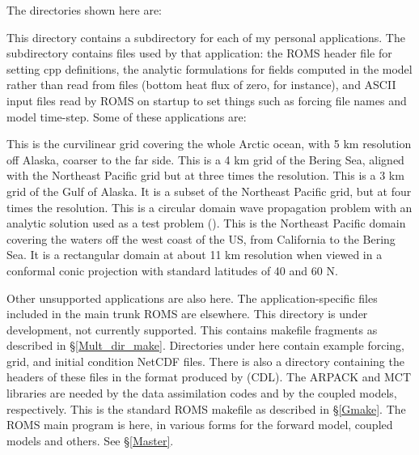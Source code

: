 The directories shown here are:
\begin{klist}
   This directory contains a subdirectory for each of my
  personal applications. The subdirectory contains files used by that
  application: the ROMS header file for setting cpp definitions, the
  analytic formulations for fields computed in the model rather than
  read from files (bottom heat flux of zero, for instance), and ASCII
  input files read by ROMS on startup to set things such as forcing file
  names and model time-step. Some of these applications are:
\begin{klist}
   This is the curvilinear grid covering the whole Arctic
  ocean, with 5 km resolution off Alaska, coarser to the far side.
   This is a 4 km grid of the Bering Sea, aligned with
  the Northeast Pacific grid but at three times the resolution.
   This is a 3 km grid of the Gulf of Alaska. It is a
  subset of the Northeast Pacific grid, but at four times the
  resolution.
   This is a circular domain wave propagation problem
  with an analytic solution used as a test problem (\cite{Lamb32}).
   This is the Northeast Pacific domain covering the
  waters off the west coast of the US, from California to the Bering
  Sea. It is a rectangular domain at about 11 km resolution when
  viewed in a conformal conic projection with standard latitudes of
  40 and 60 N.
\end{klist}
  Other unsupported applications are also here. The application-specific
  files included in the main trunk ROMS are elsewhere.
   This directory is under development, not
  currently supported.
   This contains makefile fragments as described in
  \S\ref{Mult_dir_make}.
   Directories under here contain example forcing, grid,
  and initial condition NetCDF files. There is also a directory
  containing the headers of these files in the format produced by
   (CDL).
   The ARPACK and MCT libraries are needed by the data
  assimilation codes and by the coupled models, respectively.
   This is the standard ROMS makefile as described
  in \S\ref{Gmake}.
   The ROMS main program is here, in various forms for
  the forward model, coupled models and others. See \S\ref{Master}.


\end{klist}
